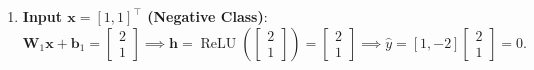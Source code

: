 \begin{enumerate}
\begin{equation}
    \end{equation}
  \item \textbf{Input $\mathbf{x} = [1, 1]^\top$ (Negative Class)}:
    \begin{equation}
    \mathbf{W}_1 \mathbf{x} + \mathbf{b}_1 = \begin{bmatrix} 2 \\ 1 \end{bmatrix} \implies \mathbf{h} = \operatorname{ReLU}\left(\begin{bmatrix} 2 \\ 1 \end{bmatrix}\right) = \begin{bmatrix} 2 \\ 1 \end{bmatrix} \implies \hat{y} = [1, -2] \begin{bmatrix} 2 \\ 1 \end{bmatrix} = 0.
    \end{equation}
\end{enumerate}

